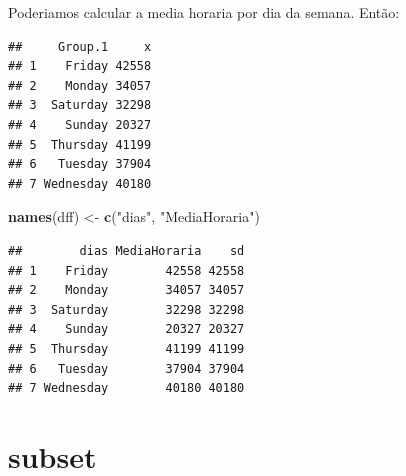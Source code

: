 \documentclass[]{book}
\newenvironment{Shaded}{\begin{snugshade}}{\end{snugshade}}
\newcommand{\KeywordTok}[1]{\textcolor[rgb]{0.13,0.29,0.53}{\textbf{#1}}}
\newcommand{\DataTypeTok}[1]{\textcolor[rgb]{0.13,0.29,0.53}{#1}}
\newcommand{\StringTok}[1]{\textcolor[rgb]{0.31,0.60,0.02}{#1}}
\newcommand{\OperatorTok}[1]{\textcolor[rgb]{0.81,0.36,0.00}{\textbf{#1}}}
\newcommand{\NormalTok}[1]{#1}
\begin{document}
Poderiamos calcular a media horaria por dia da semana. Então:

\begin{Shaded}
\end{Shaded}

\begin{verbatim}
##     Group.1     x
## 1    Friday 42558
## 2    Monday 34057
## 3  Saturday 32298
## 4    Sunday 20327
## 5  Thursday 41199
## 6   Tuesday 37904
## 7 Wednesday 40180
\end{verbatim}

\begin{Shaded}
\begin{Highlighting}[]
\KeywordTok{names}\NormalTok{(dff) <-}\StringTok{ }\KeywordTok{c}\NormalTok{(}\StringTok{"dias"}\NormalTok{, }\StringTok{"MediaHoraria"}\NormalTok{)}
\end{Highlighting}
\end{Shaded}

\begin{Shaded}
\end{Shaded}

\begin{verbatim}
##        dias MediaHoraria    sd
## 1    Friday        42558 42558
## 2    Monday        34057 34057
## 3  Saturday        32298 32298
## 4    Sunday        20327 20327
## 5  Thursday        41199 41199
## 6   Tuesday        37904 37904
## 7 Wednesday        40180 40180
\end{verbatim}

\section{subset}\label{subset}
\end{document}
